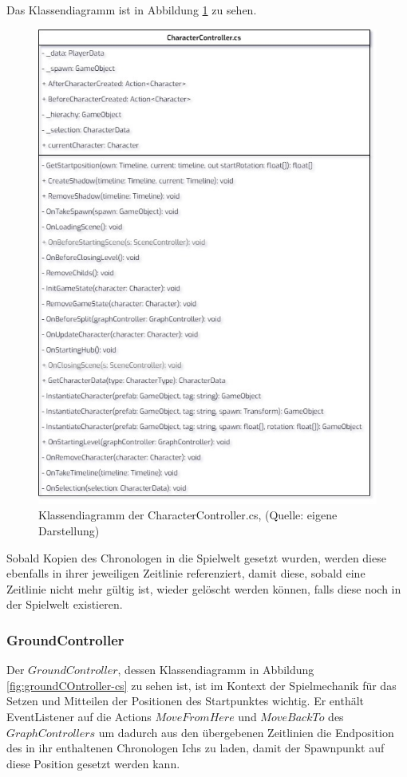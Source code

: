 Das Klassendiagramm ist in Abbildung \ref{fig:characterController-cs} zu sehen.

\begin{figure}[ht]
\centering
\includegraphics[width=0.6\linewidth]{content/pictures/CharacterController.jpg}
\caption{Klassendiagramm der CharacterController.cs, (Quelle: eigene Darstellung)}
\label{fig:characterController-cs}
\end{figure}

Sobald Kopien des Chronologen in die Spielwelt gesetzt wurden, werden diese ebenfalls in ihrer jeweiligen Zeitlinie referenziert, damit diese, sobald eine Zeitlinie nicht mehr gültig ist, wieder gelöscht werden können, falls diese noch in der Spielwelt existieren.

\subsubsection{GroundController}
Der $GroundController$, dessen Klassendiagramm in Abbildung \ref{fig:groundCOntroller-cs} zu sehen ist, ist im Kontext der Spielmechanik für das Setzen und Mitteilen der Positionen des Startpunktes wichtig. Er enthält EventListener auf die Actions $MoveFromHere$ und $MoveBackTo$ des $GraphControllers$ um dadurch aus den übergebenen Zeitlinien die Endposition des in ihr enthaltenen Chronologen Ichs zu laden, damit der Spawnpunkt auf diese Position gesetzt werden kann.

